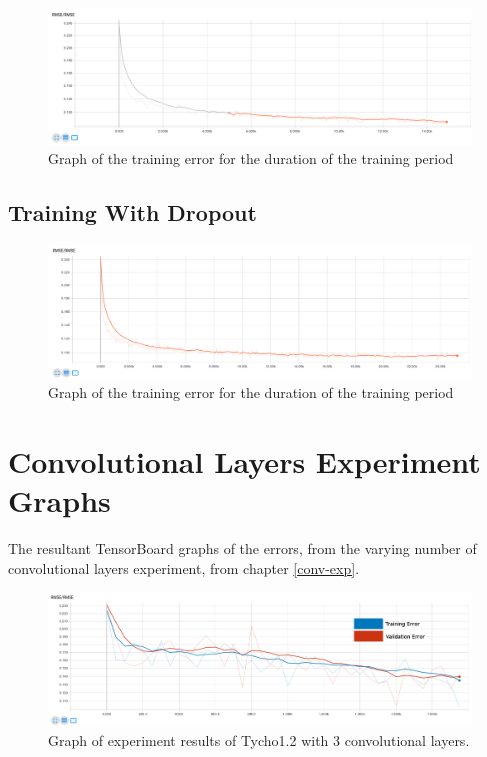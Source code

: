 \documentclass[12pt,a4paper,oneside,oldfontcommands]{memoir}
\begin{document}
\begin{Declaration Of OriginalityOrginality}
\begin{figure}[H]
  \centering
    \includegraphics[width=\linewidth]{graphs/E/tycho_21_TRAIN_CONCAT_ADAM_0004_maxout_relu.png}
    \caption{Graph of the training error for the duration of the training period}
\end{figure}

\section{Training With Dropout}

\begin{figure}[H]
  \centering
    \includegraphics[width=\linewidth]{graphs/E/tycho_21_TRAIN_CONCAT_ADAM_4e-05_maxout_relu_05.png}
    \caption{Graph of the training error for the duration of the training period}
\end{figure}

\chapter{Convolutional Layers Experiment Graphs}

The resultant TensorBoard graphs of the errors, from the varying number of convolutional layers experiment, from chapter \ref{conv-exp}.

\begin{figure}[H]
  \centering
    \includegraphics[width=\linewidth]{graphs/F/conv3.png}
    \caption{Graph of experiment results of Tycho1.2 with 3 convolutional layers.}
\end{figure}


\end{Declaration Of OriginalityOrginality}
\end{document}
